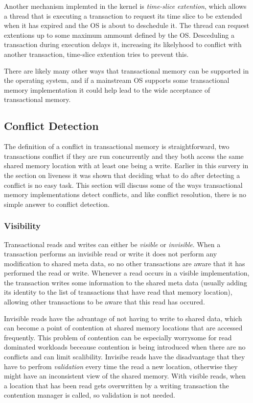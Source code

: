 Another mechanism implemted in the kernel is \emph{time-slice extention}, which allows a thread that is executing a transaction to request its time slice to be extended when it has expired and the OS is about to deschedule it.
The thread can request extentions up to some maximum ammount defined by the OS.
Desceduling a transaction during execution delays it, increasing its likelyhood to conflict with another transaction, time-slice extention tries to prevent this.

There are likely many other ways that transactional memory can be supported in the operating system, and if a mainstream OS supports some transactional memory implementation it could help lead to the wide acceptance of transactional memory.

\subsection{Conflict Detection}
The definition of a conflict in transactional memory is straightforward, two transactions conflict if they are run concurrently and they both access the same shared memory location with at least one being a write.
Earlier in this survery in the section on liveness it was shown that deciding what to do after detecting a conflict is no easy task.
This section will discuss some of the ways transactional memory implementations detect conflicts, and like conflict resolution, there is no simple answer to conflict detection.


\subsubsection{Visibility}
Transactional reads and writes can either be \emph{visible} or \emph{invisible}.
When a transaction performs an invisible read or write it does not perform any modification to shared meta data, so no other transactions are aware that it has performed the read or write.
Whenever a read occurs in a visible implementation, the transaction writes some information to the shared meta data (usually adding its identity to the list of transactions that have read that memory location), allowing other transactions to be aware that this read has occured.

Invisible reads have the advantage of not having to write to shared data, which can become a point of contention at shared memory locations that are accessed frequently.
This problem of contention can be especially worrysome for read dominated workloads beceause contention is being introduced when there are no conflicts and can limit scalibility.
Invisibe reads have the disadvantage that they have to perfrom \emph{validation} every time the read a new location, otherwise they might have an inconsistent view of the shared memory.
With visible reads, when a location that has been read gets overwritten by a writing transaction the contention manager is called, so validation is not needed.

